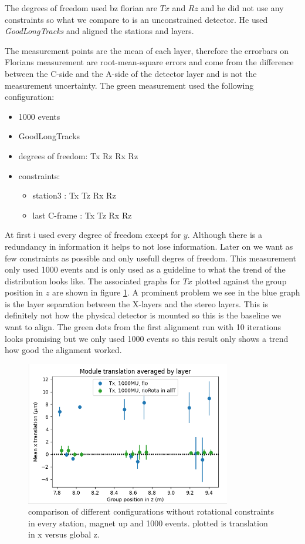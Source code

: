 The degrees of freedom used bz florian are $Tx$ and $Rz$ and he did not use any constraints so what we compare to is an unconstrained detector. He used \textit{GoodLongTracks} and aligned the stations and layers.

The measurement points are the mean of each layer, therefore the errorbars on Florians measurement are root-mean-square errors and come from the difference between the C-side and the A-side of the detector layer and is not the measurement uncertainty.
The green measurement used the following configuration:

\begin{itemize}
  \item 1000 events
  \item GoodLongTracks
  \item degrees of freedom: Tx Rz Rx Rz
  \item constraints:
  \begin{itemize}
    \item station3 : Tx Tz Rx Rz
    \item last C-frame : Tx Tz Rx Rz
  \end{itemize}
\end{itemize}

At first i used every degree of freedom except for $y$. Although there is a redundancy in information it helps to not lose information. Later on we want as few constraints as possible and only usefull degres of freedom. This measurement only used 1000 events and is only used as a guideline to what the trend of the distribution looks like. The associated graphs for $Tx$ plotted against the group position in $z$ are shown in figure \ref{fig:june_2}.
A prominent problem we see in the blue graph is the layer separation between the X-layers and
the stereo layers. This is definitely not how the physical detector is mounted so this is the baseline we want to align.
The green dots from the first alignment run with 10 iterations looks promising
but we only used 1000 events so this result only shows a trend how good the alignment worked.

\begin{figure}
  \centering
  \includegraphics[width=0.8\textwidth]{plots/june_21/Tx_noRota_allT_1000MU.png}
  \caption{comparison of different configurations without rotational constraints in every station, magnet up and 1000 events. plotted is translation in x versus global z.}
  \label{fig:june_2}
\end{figure}

